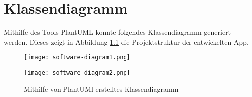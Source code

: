 
\chapter{Klassendiagramm}

Mithilfe des Tools PlantUML konnte folgendes Klassendiagramm generiert werden. Dieses zeigt in Abbildung \ref{fig:softwarediagram} die Projektstruktur der entwickelten App.

\begin{figure}[H]
    \centering
    \texttt{[image: software-diagram1.png]}
\end{figure}

\begin{figure}[H]
    \centering
    \texttt{[image: software-diagram2.png]}
    \caption{Mithilfe von PlantUMl erstelltes Klassendiagramm}
    \label{fig:softwarediagram}
\end{figure}
